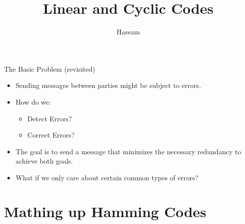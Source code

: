 \documentclass[aspectratio=169]{beamer}
\title{Linear and Cyclic Codes}
\subtitle{}
\author{Hassam}
\date{}
\begin{document}

\begin{frame}
\titlepage
\end{frame}


\begin{frame}{The Basic Problem (revisited)}
    \begin{itemize}
        \item Sending messages between parties might be subject to errors.
        \item How do we:
            \begin{itemize}
                \item Detect Errors? 
                \item Correct Errors?
            \end{itemize}
        \item The goal is to send a message that minimizes the necessary redundancy to achieve both goals. 
        \item What if we only care about certain common types of errors? 
    \end{itemize}
\end{frame}

\section{Mathing up Hamming Codes}
\frame{\sectionpage}
\end{document}
